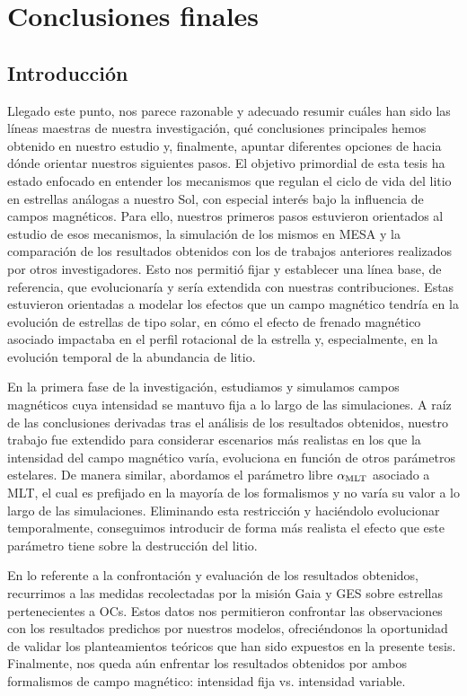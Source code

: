 
\chapter{Conclusiones finales}\label{ch:noveno-capitulo}

\section{Introducción}
Llegado este punto, nos parece razonable y adecuado resumir cuáles han sido las líneas maestras de nuestra investigación, qué conclusiones principales hemos obtenido en nuestro estudio y, finalmente, apuntar diferentes opciones de hacia dónde orientar nuestros siguientes pasos. El objetivo primordial de esta tesis ha estado enfocado en entender los mecanismos que regulan el ciclo de vida del litio en estrellas análogas a nuestro Sol, con especial interés bajo la influencia de campos magnéticos. Para ello, nuestros primeros pasos estuvieron orientados al estudio de esos mecanismos, la simulación de los mismos en MESA y la comparación de los resultados obtenidos con los de trabajos anteriores realizados por otros investigadores. Esto nos permitió fijar y establecer una línea base, de referencia, que evolucionaría y sería extendida con nuestras contribuciones. Estas estuvieron orientadas a modelar los efectos que un campo magnético tendría en la evolución de estrellas de tipo solar, en cómo el efecto de frenado magnético asociado impactaba en el perfil rotacional de la estrella y, especialmente, en la evolución temporal de la abundancia de litio.

En la primera fase de la investigación, estudiamos y simulamos campos magnéticos cuya intensidad se mantuvo fija a lo largo de las simulaciones. A raíz de las conclusiones derivadas tras el análisis de los resultados obtenidos, nuestro trabajo fue extendido para considerar escenarios más realistas en los que la intensidad del campo magnético varía, evoluciona en función de otros parámetros estelares. De manera similar, abordamos el parámetro libre $\alpha_{\mathrm{MLT}}$ asociado a MLT, el cual es prefijado en la mayoría de los formalismos y no varía su valor a lo largo de las simulaciones. Eliminando esta restricción y haciéndolo evolucionar temporalmente, conseguimos introducir de forma más realista el efecto que este parámetro tiene sobre la destrucción del litio.

En lo referente a la confrontación y evaluación de los resultados obtenidos, recurrimos a las medidas recolectadas por la misión Gaia y GES sobre estrellas pertenecientes a OCs. Estos datos nos permitieron confrontar las observaciones con los resultados predichos por nuestros modelos, ofreciéndonos la oportunidad de validar los planteamientos teóricos que han sido expuestos en la presente tesis. Finalmente, nos queda aún enfrentar los resultados obtenidos por ambos formalismos de campo magnético: intensidad fija vs. intensidad variable. 


